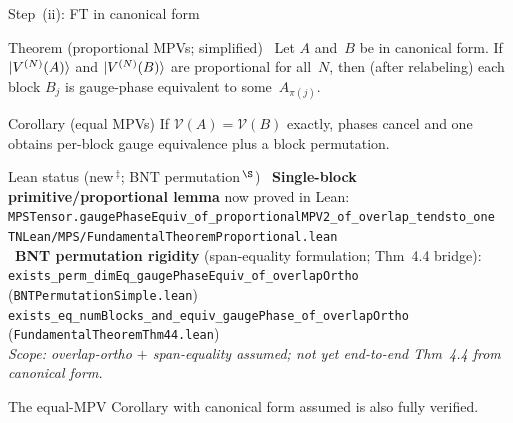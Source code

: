 \documentclass[aspectratio=169,10pt]{beamer}
\begin{document}
\begin{frame}{Step~(ii): FT in canonical form}
    \vspace{-0.6em}

    \begin{block}{Theorem (proportional MPVs; simplified)~\cite{Cirac2017Annals,Cirac2021Matrix}}
        Let $A$ and~$B$ be in canonical form.
        If $\ket{V^{(N)}(A)}$ and $\ket{V^{(N)}(B)}$ are proportional for all~$N$,
        then (after relabeling) each block $B_j$ is gauge-phase equivalent
        to some~$A_{\pi(j)}$.
    \end{block}

    \begin{block}{Corollary (equal MPVs)}
        If $\mathcal{V}(A)=\mathcal{V}(B)$ exactly, phases cancel
        and one obtains per-block gauge equivalence plus a block permutation.
    \end{block}

    \begin{block}{Lean status (new\,$^{\ddagger}$; BNT permutation\,$^{\S}$)}
        {\scriptsize
        \textcolor{leangreen}{\checkmark}~\textbf{Single-block primitive/proportional lemma}
          now proved in Lean:\\[0.05em]
        \quad\texttt{MPSTensor.gaugePhaseEquiv\_of\_proportionalMPV2\_of\_overlap\_tendsto\_one}\\
        \quad\textcolor{dimwhite}{\texttt{TNLean/MPS/FundamentalTheoremProportional.lean}}\\[0.2em]
        \textcolor{leangreen}{\checkmark}~\textbf{BNT permutation rigidity}
          (span-equality formulation; Thm~4.4 bridge):\\[0.05em]
        \quad\texttt{exists\_perm\_dimEq\_gaugePhaseEquiv\_of\_overlapOrtho}
          \textcolor{dimwhite}{(\texttt{BNTPermutationSimple.lean})}\\
        \quad\texttt{exists\_eq\_numBlocks\_and\_equiv\_gaugePhase\_of\_overlapOrtho}
          \textcolor{dimwhite}{(\texttt{FundamentalTheoremThm44.lean})}\\[0.2em]
        \textcolor{dimwhite}{\emph{Scope: overlap-ortho $+$ span-equality assumed;
            not yet end-to-end Thm~4.4 from canonical form.}}}
    \end{block}
    \textcolor{dimwhite}{\footnotesize The equal-MPV Corollary with canonical form assumed is also fully verified.}
\end{frame}
\end{document}
